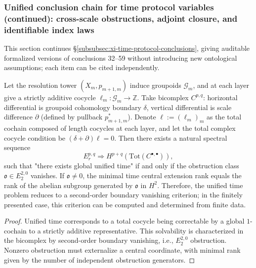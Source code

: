 \subsubsection{Unified conclusion chain for time protocol variables (continued): cross-scale obstructions, adjoint closure, and identifiable index laws}\label{subsubsec:xi-time-protocol-conclusions-part2}
This section continues \S\ref{subsubsec:xi-time-protocol-conclusions}, giving auditable formalized versions of conclusions 32--59 without introducing new ontological assumptions; each item can be cited independently.

\begin{theorem}\label{thm:xi-scale-time-bicomplex-obstruction}
Let the resolution tower \((X_m,p_{m+1,m})\) induce groupoids \(\mathcal G_m\), and at each layer give a strictly additive cocycle \(\ell_m:\mathcal G_m\to\mathbb Z\).
Take bicomplex \(C^{p,q}\): horizontal differential is groupoid cohomology boundary \(\delta\), vertical differential is scale difference \(\partial\) (defined by pullback \(p_{m+1,m}^\ast\)).
Denote \(\ell:=(\ell_m)_m\) as the total cochain composed of length cocycles at each layer, and let the total complex cocycle condition be \((\delta+\partial)\ell=0\).
Then there exists a natural spectral sequence
\[
E_r^{p,q}\Rightarrow H^{p+q}(\mathrm{Tot}(C^{\bullet,\bullet})),
\]
such that "there exists global unified time" if and only if the obstruction class \(\mathfrak o\in E_2^{2,0}\) vanishes.
If \(\mathfrak o\neq 0\), the minimal time central extension rank equals the rank of the abelian subgroup generated by \(\mathfrak o\) in \(H^2\).
Therefore, the unified time problem reduces to a second-order boundary vanishing criterion; in the finitely presented case, this criterion can be computed and determined from finite data.
\end{theorem}

\begin{proof}
Unified time corresponds to a total cocycle being correctable by a global \(1\)-cochain to a strictly additive representative.
This solvability is characterized in the bicomplex by second-order boundary vanishing, i.e., \(E_2^{2,0}\) obstruction.
Nonzero obstruction must externalize a central coordinate, with minimal rank given by the number of independent obstruction generators.
\end{proof}

